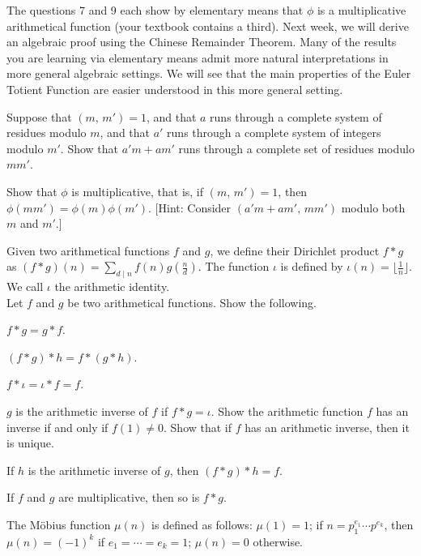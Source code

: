 \documentclass[a4paper,11pt]{article}
\theoremstyle{mythm}
\theoremstyle{mydef}
\begin{document}
The questions 7 and 9 each show by elementary means that $\phi$ is a
multiplicative arithmetical function (your textbook contains a third). Next
week, we will derive an algebraic proof using the Chinese Remainder Theorem.
Many of the results you are learning via elementary means admit more natural
interpretations in more general algebraic settings. We will see that the main
properties of the Euler Totient Function are easier understood in this more
general setting. \\

\begin{enumerate*}[{\bf (a)}]
\item Suppose that $(m,\,m')=1$, and that $a$ runs through a complete system of
  residues modulo $m$, and that $a'$ runs through a complete system of integers
  modulo $m'$. Show that $a'm+am'$ runs through a complete set of residues
  modulo $mm'$.
\item Show that $\phi$ is multiplicative, that is, if $(m,\,m')=1$, then
  $\phi(mm')=\phi(m)\phi(m')$. [Hint: Consider $(a'm+am',\,mm')$ modulo both $m$
  and $m'$.] \\
\end{enumerate*}

Given two arithmetical functions $f$ and $g$, we define their Dirichlet product
$f*g$ as $(f*g)(n)=\sum_{d \mid n}f(n)g(\frac{n}{d})$. The function $\iota$ is
defined by $\iota(n)=\lfloor \frac{1}{n} \rfloor$. We call $\iota$ the
arithmetic identity. \\

 Let $f$ and $g$ be two arithmetical functions. Show
the following.
\begin{enumerate*}[{\bf (a)}]
\item $f*g = g*f$.
\item $(f*g)*h=f*(g*h)$.
\item $f*\iota = \iota*f=f$.
\item $g$ is the arithmetic inverse of $f$ if $f*g=\iota$. Show the arithmetic
  function $f$ has an inverse if and only if $f(1) \neq 0$. Show that if $f$ has
  an arithmetic inverse, then it is unique.
\item If $h$ is the arithmetic inverse of $g$, then $(f*g)*h=f$.
\item If $f$ and $g$ are multiplicative, then so is $f*g$. \\
\end{enumerate*}

The M\"{o}bius function $\mu(n)$ is defined as follows: $\mu(1)=1$; if
$n=p_1^{e_1} \cdots p^{e_k}$, then $\mu(n)=(-1)^k$ if $e_1=\cdots=e_k=1$;
$\mu(n)=0$ otherwise. \\
\end{document}
